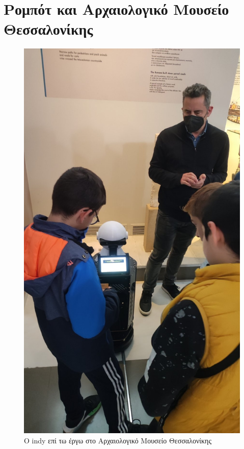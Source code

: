 \section{Ρομπότ και Αρχαιολογικό Μουσείο Θεσσαλονίκης}
\begin{figure}[H]\centering
  \includegraphics[scale=0.25]{./figures/parts/appendix/chapters/06/indy_at_museum.jpg}
  \caption{\small Ο indy επί τω έργω στο Αρχαιολογικό Μουσείο Θεσσαλονίκης}
\end{figure}
